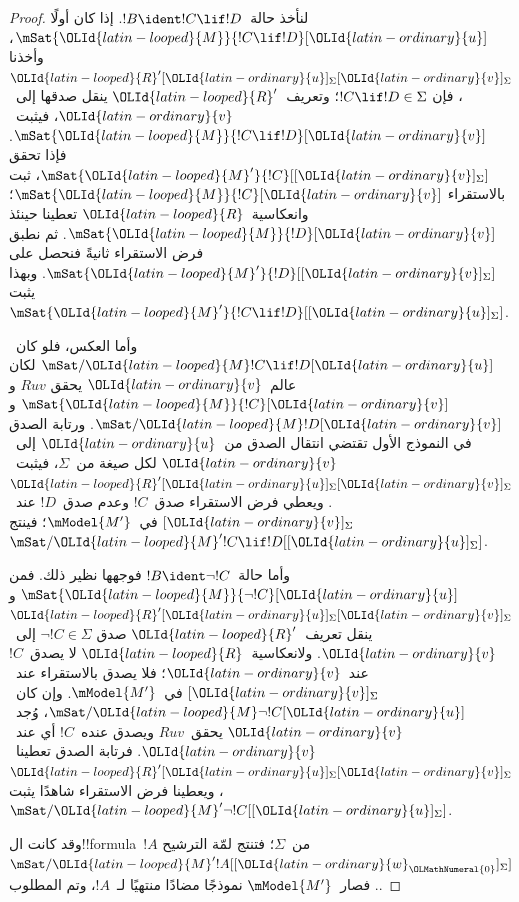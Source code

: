 \documentclass[../../../include/open-logic-section]{subfiles}
\begin{document}
\begin{proof}
  لنأخذ حالة~$!B\ident !C\lif !D$. إذا كان أولًا
  $\mSat{\OLId{latin-looped}{M}}{!C\lif !D}[\OLId{latin-ordinary}{u}]$، وأخذنا
  $\OLId{latin-looped}{R}'{[\OLId{latin-ordinary}{u}]_\Sigma}{[\OLId{latin-ordinary}{v}]_\Sigma}$، فإن
  $!C\lif !D\in\Sigma$؛ وتعريف~$\OLId{latin-looped}{R}'$ ينقل صدقها إلى~$\OLId{latin-ordinary}{v}$،
  فيثبت~$\mSat{\OLId{latin-looped}{M}}{!C\lif !D}[\OLId{latin-ordinary}{v}]$. فإذا تحقق
  $\mSat{\OLId{latin-looped}{M}'}{!C}[{[\OLId{latin-ordinary}{v}]_\Sigma}]$، ثبت بالاستقراء
  $\mSat{\OLId{latin-looped}{M}}{!C}[\OLId{latin-ordinary}{v}]$؛ وانعكاسية~$\OLId{latin-looped}{R}$ تعطينا حينئذ
  $\mSat{\OLId{latin-looped}{M}}{!D}[\OLId{latin-ordinary}{v}]$. ثم نطبق فرض الاستقراء ثانيةً فنحصل على
  $\mSat{\OLId{latin-looped}{M}'}{!D}[{[\OLId{latin-ordinary}{v}]_\Sigma}]$. وبهذا يثبت
  $\mSat{\OLId{latin-looped}{M}'}{!C\lif !D}[{[\OLId{latin-ordinary}{u}]_\Sigma}]$.

  وأما العكس، فلو كان~$\mSat/{\OLId{latin-looped}{M}}{!C\lif !D}[\OLId{latin-ordinary}{u}]$ لكان عالم~$\OLId{latin-ordinary}{v}$ يحقق
  $Ruv$ و$\mSat{\OLId{latin-looped}{M}}{!C}[\OLId{latin-ordinary}{v}]$ و$\mSat/{\OLId{latin-looped}{M}}{!D}[\OLId{latin-ordinary}{v}]$. ورتابة الصدق في
  النموذج الأول تقتضي انتقال الصدق من~$\OLId{latin-ordinary}{u}$ إلى~$\OLId{latin-ordinary}{v}$ لكل صيغة من~$\Sigma$،
  فيثبت~$\OLId{latin-looped}{R}'{[\OLId{latin-ordinary}{u}]_\Sigma}{[\OLId{latin-ordinary}{v}]_\Sigma}$. ويعطي فرض الاستقراء صدق~$!C$
  وعدم صدق~$!D$ عند~$[\OLId{latin-ordinary}{v}]_\Sigma$ في~$\mModel{M'}$؛ فينتج
  $\mSat/{\OLId{latin-looped}{M}'}{!C\lif !D}[{[\OLId{latin-ordinary}{u}]_\Sigma}]$.

  وأما حالة~$!B\ident\lnot !C$ فوجهها نظير ذلك. فمن
  $\mSat{\OLId{latin-looped}{M}}{\lnot !C}[\OLId{latin-ordinary}{u}]$ و
  $\OLId{latin-looped}{R}'{[\OLId{latin-ordinary}{u}]_\Sigma}{[\OLId{latin-ordinary}{v}]_\Sigma}$ ينقل تعريف~$\OLId{latin-looped}{R}'$ صدق
  $\lnot !C\in\Sigma$ إلى~$\OLId{latin-ordinary}{v}$. ولانعكاسية~$\OLId{latin-looped}{R}$ لا يصدق~$!C$ عند~$\OLId{latin-ordinary}{v}$؛
  فلا يصدق بالاستقراء عند~$[\OLId{latin-ordinary}{v}]_\Sigma$ في~$\mModel{M'}$. وإن
  كان~$\mSat/{\OLId{latin-looped}{M}}{\lnot !C}[\OLId{latin-ordinary}{u}]$، وُجد~$\OLId{latin-ordinary}{v}$ يحقق~$Ruv$ ويصدق عنده~$!C$
  أي عند~$\OLId{latin-ordinary}{v}$. فرتابة الصدق تعطينا~$\OLId{latin-looped}{R}'{[\OLId{latin-ordinary}{u}]_\Sigma}{[\OLId{latin-ordinary}{v}]_\Sigma}$،
  ويعطينا فرض الاستقراء شاهدًا يثبت
  $\mSat/{\OLId{latin-looped}{M}'}{\lnot !C}[{[\OLId{latin-ordinary}{u}]_\Sigma}]$.

  وقد كانت ال!!{formula}~$!A$ من~$\Sigma$؛ فتنتج لمّة الترشيح
  $\mSat/{\OLId{latin-looped}{M}'}{!A}[{[\OLId{latin-ordinary}{w}_\OLMathNumeral{0}]_\Sigma}]$. فصار~$\mModel{M'}$ نموذجًا
  مضادًا منتهيًا لـ~$!A$، وتم المطلوب.
\end{proof}
\end{document}
